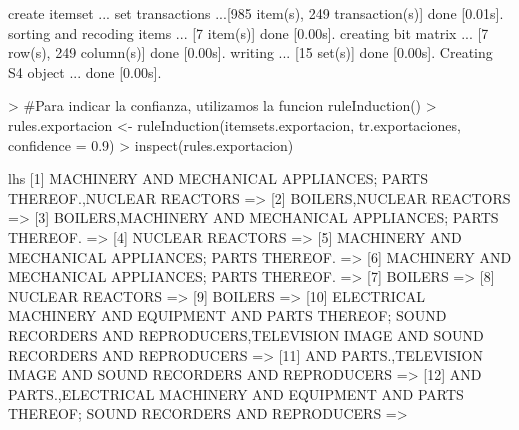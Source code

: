 \documentclass [a4paper] {article}
\begin{document}
{\begin{Schunk}
\begin{Soutput}
create itemset ... 
set transactions ...[985 item(s), 249 transaction(s)] done [0.01s].
sorting and recoding items ... [7 item(s)] done [0.00s].
creating bit matrix ... [7 row(s), 249 column(s)] done [0.00s].
writing  ... [15 set(s)] done [0.00s].
Creating S4 object  ... done [0.00s].
\end{Soutput}
\begin{Sinput}
> #Para indicar la confianza, utilizamos la funcion ruleInduction()
> rules.exportacion <- ruleInduction(itemsets.exportacion, tr.exportaciones, confidence = 0.9)
> inspect(rules.exportacion)
\end{Sinput}
\begin{Soutput}
     lhs                                                                                                                                            
[1]  {MACHINERY AND MECHANICAL APPLIANCES; PARTS THEREOF.,NUCLEAR REACTORS}                                                                       =>
[2]  {BOILERS,NUCLEAR REACTORS}                                                                                                                   =>
[3]  {BOILERS,MACHINERY AND MECHANICAL APPLIANCES; PARTS THEREOF.}                                                                                =>
[4]  {NUCLEAR REACTORS}                                                                                                                           =>
[5]  {MACHINERY AND MECHANICAL APPLIANCES; PARTS THEREOF.}                                                                                        =>
[6]  {MACHINERY AND MECHANICAL APPLIANCES; PARTS THEREOF.}                                                                                        =>
[7]  {BOILERS}                                                                                                                                    =>
[8]  {NUCLEAR REACTORS}                                                                                                                           =>
[9]  {BOILERS}                                                                                                                                    =>
[10] {ELECTRICAL MACHINERY AND EQUIPMENT AND PARTS THEREOF; SOUND RECORDERS AND REPRODUCERS,TELEVISION IMAGE AND SOUND RECORDERS AND REPRODUCERS} =>
[11] {AND PARTS.,TELEVISION IMAGE AND SOUND RECORDERS AND REPRODUCERS}                                                                            =>
[12] {AND PARTS.,ELECTRICAL MACHINERY AND EQUIPMENT AND PARTS THEREOF; SOUND RECORDERS AND REPRODUCERS}                                           =>

\end{Soutput}
\end{Schunk}}
\end{document}
